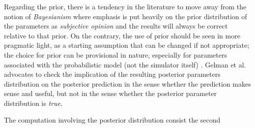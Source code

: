 Regarding the prior, there is a tendency in the literature \cite{Gelman2013,McElreath2015} to move away from the notion of \emph{Bayesianism} where emphasis is put heavily on the prior distribution of the parameters as \emph{subjective opinion} and the results will always be correct relative to that prior.
On the contrary, the use of prior should be seen in more pragmatic light, as a starting assumption that can be changed if not appropriate; the choice for prior can be provisional in nature, especially for parameters associated with the probabilistic model (not the simulator itself) \cite{Gelman2002,Gelman2006}.
Gelman et al.~\cite{Gelman2013} advocates to check the implication of the resulting posterior parameters distribution on the posterior prediction in the sense whether the prediction makes sense and useful, but not in the sense whether the posterior parameter distribution is \emph{true}.

The computation involving the posterior distribution consist the second 






